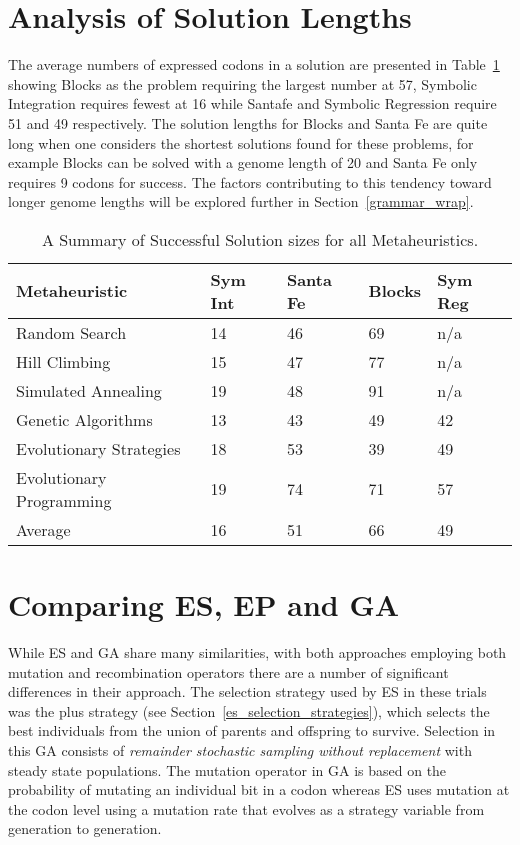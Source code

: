 \section{Analysis of Solution Lengths}
The average numbers of expressed codons in a solution are presented in Table~\ref{all_characteristic_analysis_table} showing Blocks as the problem requiring the largest number at 57, Symbolic Integration requires fewest at 16 while Santafe and Symbolic Regression require 51 and 49 respectively. The solution lengths for Blocks and Santa Fe are quite long when one considers the shortest solutions found for these problems, for example Blocks can be solved with a genome length of 20 and Santa Fe only requires 9 codons for success. The factors contributing to this tendency toward longer genome lengths will be explored further in Section~\ref{grammar_wrap}. 



\begin{table}[h]
\begin{center}
\begin{tabular}{|l|l|l|l|l|}
\hline
Metaheuristic             & Sym Int & Santa Fe & Blocks & Sym Reg  \\
\hline
Random Search             & 14      & 46       & 69     & n/a   \\
Hill Climbing             & 15      & 47       & 77     & n/a  \\
Simulated Annealing       & 19      & 48       & 91     & n/a \\
Genetic Algorithms        & 13      & 43       & 49     & 42  \\
Evolutionary Strategies   & 18      & 53       & 39     & 49  \\
Evolutionary Programming  & 19      & 74       & 71     & 57 \\
\hline
Average                   & 16      & 51       & 66     & 49 \\
\hline
\end{tabular}
\caption{\label{all_characteristic_analysis_table} A Summary of Successful Solution sizes for all Metaheuristics.}
\end{center}
\end{table}

\section{Comparing ES, EP and GA}

While ES and GA share many similarities, with both approaches employing both mutation and recombination operators there are a number of significant differences in their approach. The selection strategy used by ES in these trials was the plus strategy (see Section~\ref{es_selection_strategies}), which selects  the best individuals from the union of parents and offspring  to survive. Selection in this GA consists of \emph{remainder stochastic sampling without replacement} with steady state populations. The mutation operator in GA is based on the probability of mutating an individual bit in a codon whereas ES uses mutation at the codon level using a mutation rate that evolves as a strategy variable from generation to generation. 

